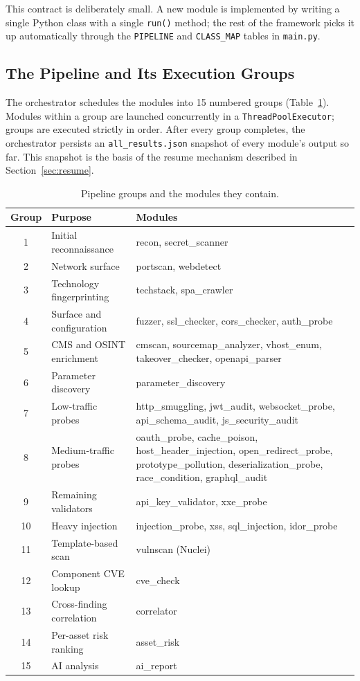 This contract is deliberately small. A new module is implemented by writing a single Python class with a single \texttt{run()} method; the rest of the framework picks it up automatically through the \texttt{PIPELINE} and \texttt{CLASS\_MAP} tables in \texttt{main.py}.

\subsection{The Pipeline and Its Execution Groups}

The orchestrator schedules the modules into 15 numbered groups (Table~\ref{tab:pipeline-groups}). Modules within a group are launched concurrently in a \texttt{ThreadPoolExecutor}; groups are executed strictly in order. After every group completes, the orchestrator persists an \texttt{all\_results.json} snapshot of every module's output so far. This snapshot is the basis of the resume mechanism described in Section~\ref{sec:resume}.

\begin{table}[h]
\centering
\small
\begin{tabular}{|c|p{4cm}|p{7cm}|}
\hline
\textbf{Group} & \textbf{Purpose} & \textbf{Modules} \\
\hline
1  & Initial reconnaissance     & recon, secret\_scanner \\
2  & Network surface            & portscan, webdetect \\
3  & Technology fingerprinting  & techstack, spa\_crawler \\
4  & Surface and configuration  & fuzzer, ssl\_checker, cors\_checker, auth\_probe \\
5  & CMS and OSINT enrichment   & cmscan, sourcemap\_analyzer, vhost\_enum, takeover\_checker, openapi\_parser \\
6  & Parameter discovery        & parameter\_discovery \\
7  & Low-traffic probes         & http\_smuggling, jwt\_audit, websocket\_probe, api\_schema\_audit, js\_security\_audit \\
8  & Medium-traffic probes      & oauth\_probe, cache\_poison, host\_header\_injection, open\_redirect\_probe, prototype\_pollution, deserialization\_probe, race\_condition, graphql\_audit \\
9  & Remaining validators       & api\_key\_validator, xxe\_probe \\
10 & Heavy injection            & injection\_probe, xss, sql\_injection, idor\_probe \\
11 & Template-based scan        & vulnscan (Nuclei) \\
12 & Component CVE lookup       & cve\_check \\
13 & Cross-finding correlation  & correlator \\
14 & Per-asset risk ranking     & asset\_risk \\
15 & AI analysis                & ai\_report \\
\hline
\end{tabular}
\caption{Pipeline groups and the modules they contain.}
\label{tab:pipeline-groups}
\end{table}

